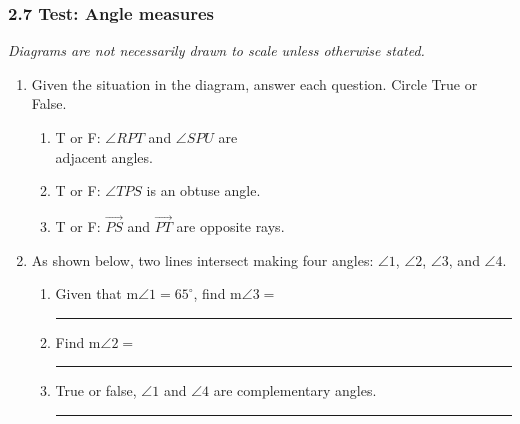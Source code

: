 

\fancyhead[LE]{\thepage}



\subsubsection*{2.7 Test: Angle measures}
\emph{Diagrams are not necessarily drawn to scale unless otherwise stated.}
\begin{enumerate}
\item Given the situation in the diagram, answer each question. Circle True or False. \vspace{0.25cm}
  \begin{multicols}{2}
    \begin{enumerate}
      \item T or F: $\angle RPT$ and $\angle SPU$ are \\adjacent angles. \bigskip
      \item T or F: $\angle TPS$ is an obtuse angle.\bigskip
      \item T or F: $\overrightarrow{PS}$ and $\overrightarrow{PT}$ are opposite rays.\bigskip
    \end{enumerate}
  \end{multicols}

\item As shown below, two lines intersect making four angles: $\angle 1$, $\angle 2$, $\angle 3$, and $\angle 4$.
  \begin{center}
  \end{center}
  \begin{enumerate}
  \item Given that m$\angle 1= 65^\circ$, find m$\angle 3=$ \rule{2.5cm}{0.15mm} \bigskip
  \item Find m$\angle 2=$ \rule{2.5cm}{0.15mm} \bigskip
  \item True or false, $\angle 1$ and $\angle 4$ are complementary angles. \rule{3cm}{0.15mm}
\end{enumerate}


\end{enumerate}
